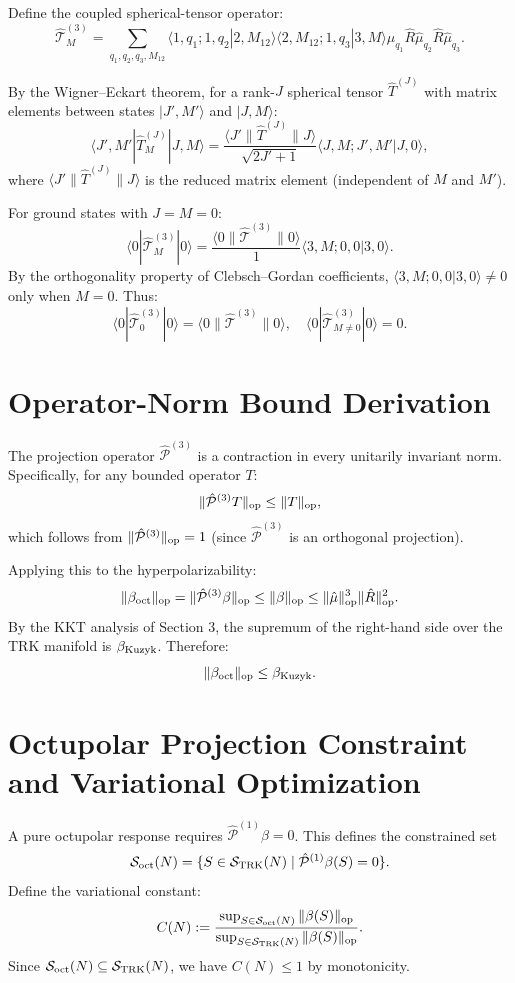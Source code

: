 \documentclass[11pt]{article}
\newcommand{\Proj}[1]{\hat{\mathcal{P}}^{(#1)}}
\newcommand{\CG}[6]{\langle #1, #2 ; #3, #4 | #5, #6 \rangle}
\begin{document}
Define the coupled spherical-tensor operator:
\[
\hat{\mathcal{T}}^{(3)}_M = \sum_{q_1, q_2, q_3, M_{12}} \CG{1}{q_1}{1}{q_2}{2}{M_{12}} \CG{2}{M_{12}}{1}{q_3}{3}{M} \hat{\mu}_{q_1}\hat{R}\hat{\mu}_{q_2}\hat{R}\hat{\mu}_{q_3}.
\]

By the Wigner--Eckart theorem, for a rank-$J$ spherical tensor $\hat{T}^{(J)}$ with matrix elements between states $|J',M'\rangle$ and $|J,M\rangle$:
\[
\langle J', M' | \hat{T}^{(J)}_M | J, M \rangle = \frac{\langle J' \| \hat{T}^{(J)} \| J \rangle}{\sqrt{2J'+1}} \CG{J}{M}{J'}{M'}{J}{0},
\]
where $\langle J' \| \hat{T}^{(J)} \| J \rangle$ is the reduced matrix element (independent of $M$ and $M'$).

For ground states with $J = M = 0$:
\[
\langle 0 | \hat{\mathcal{T}}^{(3)}_M | 0 \rangle = \frac{\langle 0 \| \hat{\mathcal{T}}^{(3)} \| 0 \rangle}{1} \CG{3}{M}{0}{0}{3}{0}.
\]
By the orthogonality property of Clebsch--Gordan coefficients, $\CG{3}{M}{0}{0}{3}{0} \ne 0$ only when $M = 0$. Thus:
\[
\langle 0 | \hat{\mathcal{T}}^{(3)}_0 | 0 \rangle = \langle 0 \| \hat{\mathcal{T}}^{(3)} \| 0 \rangle, \quad \langle 0 | \hat{\mathcal{T}}^{(3)}_{M \neq 0} | 0 \rangle = 0.
\]

\section{Operator-Norm Bound Derivation}

The projection operator $\Proj{3}$ is a contraction in every unitarily invariant norm. Specifically, for any bounded operator $T$:
\[
\|\Proj{3}T\|_{\rm op} \le \|T\|_{\rm op},
\]
which follows from $\|\Proj{3}\|_{\rm op} = 1$ (since $\Proj{3}$ is an orthogonal projection).

Applying this to the hyperpolarizability:
\[
\|\beta_{\rm oct}\|_{\rm op}=\|\Proj{3}\beta\|_{\rm op}\le\|\beta\|_{\rm op}\le\|\hat{\vb{\mu}}\|_{\rm op}^3\|\hat{R}\|_{\rm op}^2.
\]
By the KKT analysis of Section 3, the supremum of the right-hand side over the TRK manifold is $\beta_{\rm Kuzyk}$. Therefore:
\[
\|\beta_{\rm oct}\|_{\rm op} \le \beta_{\rm Kuzyk}.
\]

\section{Octupolar Projection Constraint and Variational Optimization}

A pure octupolar response requires $\Proj{1}\beta = 0$. This defines the constrained set
\[
\mathcal{S}_{\rm oct}(N)=\{S\in\mathcal{S}_{\rm TRK}(N) \mid \Proj{1}\beta(S)=0\}.
\]
Define the variational constant:
\[
C(N) := \frac{\sup_{S\in\mathcal{S}_{\rm oct}(N)}\|\beta(S)\|_{\rm op}}{\sup_{S\in\mathcal{S}_{\rm TRK}(N)}\|\beta(S)\|_{\rm op}}.
\]
Since $\mathcal{S}_{\rm oct}(N) \subseteq \mathcal{S}_{\rm TRK}(N)$, we have $C(N) \le 1$ by monotonicity.
\end{document}
